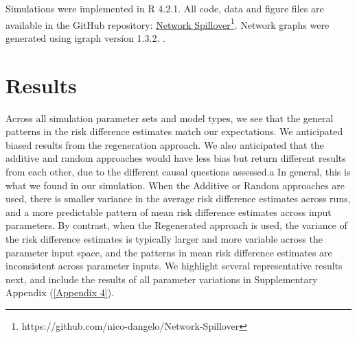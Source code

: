 \documentclass{article}
\theoremstyle{definition}
\begin{document}
Simulations were implemented in R 4.2.1. All code, data and figure files are available in the GitHub repository: \href{https://github.com/nico-dangelo/Network-Spillover}{Network Spillover}\footnote{https://github.com/nico-dangelo/Network-Spillover}. Network graphs were generated using igraph version 1.3.2. \cite{csardi_igraph_2005}. 


\section{Results}


Across all simulation parameter sets and model types, we see that the general patterns in the risk difference estimates match our expectations. We anticipated biased results from the regeneration approach. We also anticipated that the additive and random approaches would have less bias but return different results from each other, due to the different causal questions assessed.a In general, this is what we found in our simulation. When the Additive or Random approaches are used, there is smaller variance in the average risk difference estimates across runs, and a more predictable pattern of mean risk difference estimates across input parameters. By contrast, when the Regenerated approach is used, the variance of the risk difference estimates is typically larger and more variable across the parameter input space, and the patterns in mean risk difference estimates are inconsistent across parameter inputs. We highlight several representative results next, and include the results of all parameter variations in Supplementary Appendix (\ref{Appendix 4}).
\end{document}
